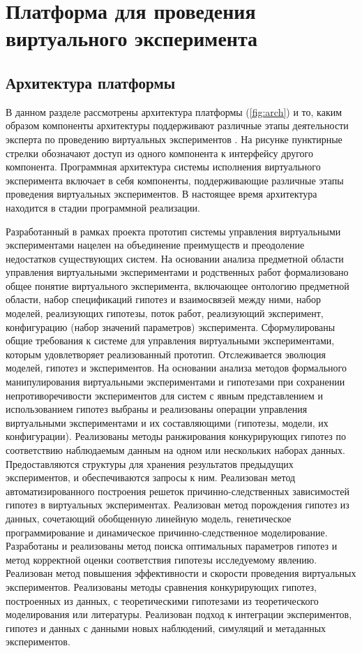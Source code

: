 \chapter{Платформа для проведения виртуального эксперимента} \label{chapt4}


\section{Архитектура платформы}\label{sect_4_2}
В данном разделе рассмотрены архитектура платформы (\cref{fig:arch}) и то, каким образом компоненты архитектуры 
поддерживают различные этапы деятельности эксперта по проведению виртуальных экспериментов \cite{Kovalev2020_arch}. 
На рисунке пунктирные стрелки обозначают доступ из одного компонента к интерфейсу другого компонента. Программная 
архитектура системы исполнения виртуального эксперимента включает в себя компоненты, поддерживающие различные этапы 
проведения виртуальных экспериментов. В настоящее время архитектура находится в стадии программной реализации.

Разработанный в рамках проекта прототип системы управления виртуальными экспериментами нацелен на объединение 
преимуществ и преодоление недостатков существующих систем. На основании анализа предметной области управления 
виртуальными экспериментами и родственных работ формализовано общее понятие виртуального эксперимента, включающее 
онтологию предметной области, набор спецификаций гипотез и взаимосвязей между ними, набор моделей, реализующих 
гипотезы, поток работ, реализующий эксперимент, конфигурацию (набор значений параметров) эксперимента. Сформулированы 
общие требования к системе для управления виртуальными экспериментами, которым удовлетворяет реализованный прототип. 
Отслеживается эволюция моделей, гипотез и экспериментов. На основании анализа методов формального манипулирования 
виртуальными экспериментами и гипотезами при сохранении непротиворечивости экспериментов для систем с явным 
представлением и использованием гипотез выбраны и реализованы операции управления виртуальными экспериментами и 
их составляющими (гипотезы, модели, их конфигурации). Реализованы методы ранжирования конкурирующих гипотез по 
соответствию наблюдаемым данным на одном или нескольких наборах данных. Предоставляются структуры для хранения 
результатов предыдущих экспериментов, и обеспечиваются запросы к ним. Реализован метод автоматизированного построения 
решеток причинно-следственных зависимостей гипотез в виртуальных экспериментах. Реализован метод порождения гипотез 
из данных, сочетающий обобщенную линейную модель, генетическое программирование и динамическое причинно-следственное 
моделирование. Разработаны и реализованы метод поиска оптимальных параметров гипотез и метод корректной оценки 
соответствия гипотезы исследуемому явлению. Реализован метод повышения эффективности и скорости проведения виртуальных 
экспериментов. Реализованы методы сравнения конкурирующих гипотез, построенных из данных, с теоретическими гипотезами 
из теоретического моделирования или литературы. Реализован подход к интеграции экспериментов, гипотез и данных с 
данными новых наблюдений, симуляций и метаданных экспериментов.

